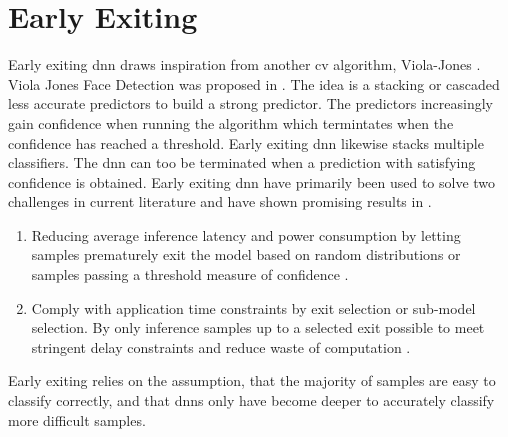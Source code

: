 \hypertarget{earlyexiting}{%
	\chapter{Early Exiting}\label{ch:earlyexit}}
\thispagestyle{fancy}

Early exiting \gls{dnn} draws inspiration from another \gls{cv} algorithm, Viola-Jones \cite{viola_rapid_2001}. Viola Jones Face Detection was proposed in \citeyear{viola_rapid_2001}. The idea is a stacking or cascaded less accurate predictors to build a strong predictor. The predictors increasingly gain confidence when running the algorithm which termintates when the confidence has reached a threshold. Early exiting \gls{dnn} likewise stacks multiple classifiers. The \gls{dnn} can too be terminated when a prediction with satisfying confidence is obtained. Early exiting \gls{dnn} have primarily been used to solve two challenges in current literature and have shown promising results in \cite{leroux_cascading_2017, teerapittayanon_branchynet:_2016, leroux_resource-constrained_2015, teerapittayanon_distributed_2017, huang_multi-scale_2017, li_edge_2018}.

\begin{enumerate}
	\item Reducing average inference latency and power consumption by letting samples prematurely exit the model based on random distributions \cite{bibid} or samples passing a threshold measure of confidence \cite{teerapittayanon_branchynet:_2016}.
	\item Comply with application time constraints by exit selection or sub-model selection. By only inference samples up to a selected exit possible to meet stringent delay constraints and reduce waste of computation \cite{li_edge_2018}. 
\end{enumerate}


Early exiting relies on the assumption, that the majority of samples are easy to classify correctly, and that \gls{dnn}s only have become deeper to accurately classify more difficult samples.

